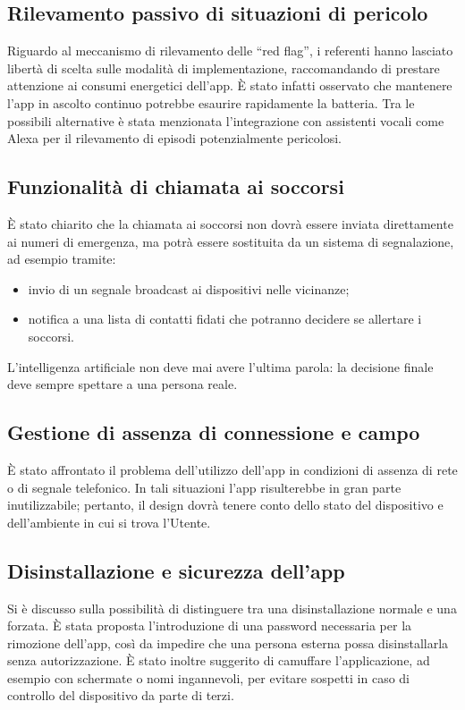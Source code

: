 \documentclass[a4paper,12pt]{article}
\begin{document}
\subsection{Rilevamento passivo di situazioni di pericolo}
Riguardo al meccanismo di rilevamento delle “red flag”, i referenti hanno lasciato libertà di scelta sulle modalità di implementazione, raccomandando di prestare attenzione ai consumi energetici dell'app.  
È stato infatti osservato che mantenere l’app in ascolto continuo potrebbe esaurire rapidamente la batteria. Tra le possibili alternative è stata menzionata l’integrazione con assistenti vocali come Alexa per il rilevamento di episodi potenzialmente pericolosi.

\subsection{Funzionalità di chiamata ai soccorsi}
È stato chiarito che la chiamata ai soccorsi non dovrà essere inviata direttamente ai numeri di emergenza, ma potrà essere sostituita da un sistema di segnalazione, ad esempio tramite:
\begin{itemize}
    \item invio di un segnale broadcast ai dispositivi nelle vicinanze;
    \item notifica a una lista di contatti fidati che potranno decidere se allertare i soccorsi.
\end{itemize}
L’intelligenza artificiale non deve mai avere l’ultima parola: la decisione finale deve sempre spettare a una persona reale.

\subsection{Gestione di assenza di connessione e campo}
È stato affrontato il problema dell’utilizzo dell’app in condizioni di assenza di rete o di segnale telefonico.  
In tali situazioni l’app risulterebbe in gran parte inutilizzabile; pertanto, il design dovrà tenere conto dello stato del dispositivo e dell’ambiente in cui si trova l’Utente.

\subsection{Disinstallazione e sicurezza dell’app}
Si è discusso sulla possibilità di distinguere tra una disinstallazione normale e una forzata.  
È stata proposta l’introduzione di una password necessaria per la rimozione dell’app, così da impedire che una persona esterna possa disinstallarla senza autorizzazione.  
È stato inoltre suggerito di camuffare l’applicazione, ad esempio con schermate o nomi ingannevoli, per evitare sospetti in caso di controllo del dispositivo da parte di terzi.
\end{document}
